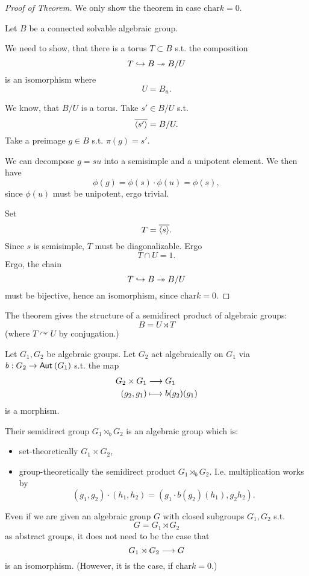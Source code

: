 \begin{proof}[Proof of Theorem]
	We only show the theorem in case $\mathrm{char} k = 0$.
	
	Let $B$ be a connected solvable algebraic group.
	
	We need to show, that there is a torus $T \subset B$ s.t. the composition
	\[ T \overset{}{\hookrightarrow} B \overset{}{\twoheadrightarrow} B/U \]
	is an isomorphism where
	\[ U = B_u. \]
	
	We know, that $B/U$ is a torus. Take $s' \in B/U$ s.t.
	\[ \overline{\left<s'\right>} = B / U. \]
	Take a preimage $g \in B$ s.t. $\pi(g) = s'$.
	
	We can decompose $g=su$ into a semisimple and a unipotent element. We then have
	\[ \phi(g) = \phi(s) \cdot \phi(u) = \phi(s), \]
	since $\phi(u)$ must be unipotent, ergo trivial.
	
	Set
	\[ T= \overline{\left<s\right>}. \]
	Since $s$ is semisimple, $T$ must be diagonalizable. Ergo
	\[ T\cap U = 1. \]
	Ergo, the chain
	\[ T \overset{}{\hookrightarrow} B \overset{}{\twoheadrightarrow} B/U \]
	must be bijective, hence an isomorphism, since $\mathrm{char} k = 0$.
\end{proof}
The theorem gives the structure of a semidirect product of algebraic groups:
\[ B = U \rtimes T \]
(where $T \curvearrowright U$ by conjugation.)

\begin{definition}
	Let $G_1, G_2$ be algebraic groups. Let $G_2$ act algebraically on $G_1$ via $b : G_2 \overset{}{\rightarrow} \textsf{Aut}_{}\left(G_1\right)$ s.t. the map
	\begin{align*}
	G_2 \times G_1 &\overset{}{\longrightarrow} G_1\\
	(g_2,g_1) & \longmapsto b(g_2)(g_1)
	\end{align*}
	is a morphism.
	
	Their semidirect group $G_1 \rtimes_b G_2$ is an algebraic group which is:
	\begin{itemize}
		\item set-theoretically $G_1 \times G_2$,
		\item group-theoretically the semidirect product $G_1 \rtimes_b G_2$. I.e. multiplication works by
		\[ (g_1,g_2) \cdot (h_1, h_2) = (g_1 \cdot b(g_2)(h_1), g_2 h_2 ). \]
	\end{itemize}
\end{definition}
\begin{remark}
	Even if we are given an algebraic group $G$ with closed subgroups $G_1, G_2$ s.t.
	\[ G = G_1 \rtimes G_2 \]
	 as abstract groups, it does not need to be the case that
	 \[ G_1 \rtimes G_2 \overset{}{\longrightarrow} G \]
	 is an isomorphism.
	 (However, it is the case, if $\mathrm{char} k = 0$.)
\end{remark}

